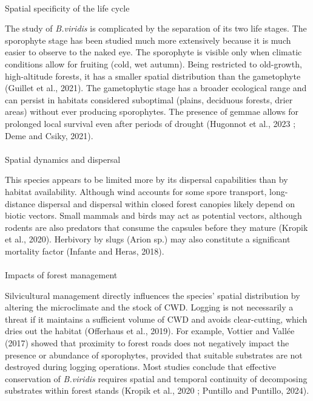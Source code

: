 \documentclass[
  letterpaper,
  DIV=11,
  numbers=noendperiod]{scrartcl}
\makeatletter
\let\oldparagraph\paragraph
\renewcommand{\paragraph}{
    \@ifstar
      \xxxParagraphStar
      \xxxParagraphNoStar
  }
\newcommand{\xxxParagraphStar}[1]{\oldparagraph*{#1}\mbox{}}
\newcommand{\xxxParagraphNoStar}[1]{\oldparagraph{#1}\mbox{}}
\makeatother
\begin{document}
\paragraph{Spatial specificity of the life
cycle}\label{spatial-specificity-of-the-life-cycle}

The study of \emph{B.viridis} is complicated by the separation of its
two life stages. The sporophyte stage has been studied much more
extensively because it is much easier to observe to the naked eye. The
sporophyte is visible only when climatic conditions allow for fruiting
(cold, wet autumn). Being restricted to old-growth, high-altitude
forests, it has a smaller spatial distribution than the gametophyte
(Guillet et al., 2021). The gametophytic stage has a broader ecological
range and can persist in habitats considered suboptimal (plains,
deciduous forests, drier areas) without ever producing sporophytes. The
presence of gemmae allows for prolonged local survival even after
periods of drought (Hugonnot et al., 2023 ; Deme and Csiky, 2021).

\paragraph{Spatial dynamics and
dispersal}\label{spatial-dynamics-and-dispersal}

This species appears to be limited more by its dispersal capabilities
than by habitat availability. Although wind accounts for some spore
transport, long-distance dispersal and dispersal within closed forest
canopies likely depend on biotic vectors. Small mammals and birds may
act as potential vectors, although rodents are also predators that
consume the capsules before they mature (Kropik et al., 2020). Herbivory
by slugs (Arion sp.) may also constitute a significant mortality factor
(Infante and Heras, 2018).

\paragraph{Impacts of forest
management}\label{impacts-of-forest-management}

Silvicultural management directly influences the species' spatial
distribution by altering the microclimate and the stock of CWD. Logging
is not necessarily a threat if it maintains a sufficient volume of CWD
and avoids clear-cutting, which dries out the habitat (Offerhaus et al.,
2019). For example, Vottier and Vallée (2017) showed that proximity to
forest roads does not negatively impact the presence or abundance of
sporophytes, provided that suitable substrates are not destroyed during
logging operations. Most studies conclude that effective conservation of
\emph{B.viridis} requires spatial and temporal continuity of decomposing
substrates within forest stands (Kropik et al., 2020 ; Puntillo and
Puntillo, 2024).
\end{document}
